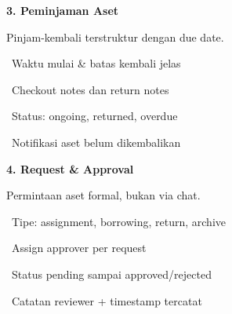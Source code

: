 \documentclass[a4paper]{article}
\begin{document}
\vspace{8pt}

\noindent
\begin{minipage}[t]{0.485\textwidth}
    \colorbox{PurplePrimary}{%
        \begin{minipage}{\dimexpr\textwidth-2\fboxsep\relax}
            {\fontsize{10}{13}\selectfont\bfseries\color{White} 3. Peminjaman Aset}
        \end{minipage}}\par
    \vspace{4pt}
    {\fontsize{9}{12}\selectfont\color{TextDark}%
    Pinjam-kembali terstruktur dengan due date.\par\vspace{3pt}
    \textbullet\ Waktu mulai \& batas kembali jelas\par\vspace{2pt}%
    \textbullet\ Checkout notes dan return notes\par\vspace{2pt}%
    \textbullet\ Status: ongoing, returned, overdue\par\vspace{2pt}%
    \textbullet\ Notifikasi aset belum dikembalikan}%
\end{minipage}%
\hfill
\begin{minipage}[t]{0.485\textwidth}
    \colorbox{BlueDark}{%
        \begin{minipage}{\dimexpr\textwidth-2\fboxsep\relax}
            {\fontsize{10}{13}\selectfont\bfseries\color{White} 4. Request \& Approval}
        \end{minipage}}\par
    \vspace{4pt}
    {\fontsize{9}{12}\selectfont\color{TextDark}%
    Permintaan aset formal, bukan via chat.\par\vspace{3pt}
    \textbullet\ Tipe: assignment, borrowing, return, archive\par\vspace{2pt}%
    \textbullet\ Assign approver per request\par\vspace{2pt}%
    \textbullet\ Status pending sampai approved/rejected\par\vspace{2pt}%
    \textbullet\ Catatan reviewer + timestamp tercatat}%
\end{minipage}

\vspace{8pt}
\end{document}
